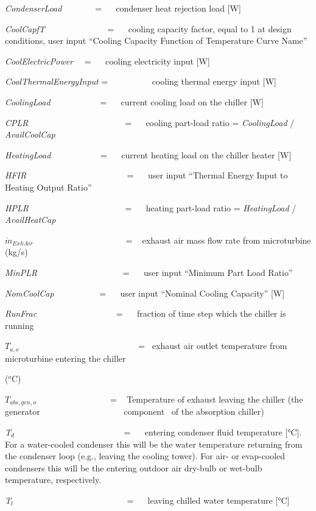 \emph{CondenserLoad~~~~~~~} = ~~ condenser heat rejection load {[}W{]}

\emph{CoolCapfT}~~~~~~~~~~~~~~ = ~~ cooling capacity factor, equal to 1 at design conditions, user input ``Cooling Capacity Function of Temperature Curve Name''

\emph{CoolElectricPower}~~ = ~~ cooling electricity input {[}W{]}

\emph{CoolThermalEnergyInput} = ~~~~~~~~~ cooling thermal energy input {[}W{]}

\emph{CoolingLoad}~~~~~~~~~~~ = ~~ current cooling load on the chiller {[}W{]}

\emph{CPLR}~~~~~~~~~~~~~~~~~~~~~~ = ~~ cooling part-load ratio = \emph{CoolingLoad} / \emph{AvailCoolCap}

\emph{HeatingLoad}~~~~~~~~~~~ = ~~ current heating load on the chiller heater {[}W{]}

\emph{HFIR}~~~~~~~~~~~~~~~~~~~~~~~ = ~~ user input ``Thermal Energy Input to Heating Output Ratio''

\emph{HPLR}~~~~~~~~~~~~~~~~~~~~~~ = ~~ heating part-load ratio = \emph{HeatingLoad} / \emph{AvailHeatCap}

\({\dot m_{ExhAir}}\) ~~~~~~ ~~~~~~~~~~~ ~~ = ~ exhaust air mass flow rate from microturbine (kg/s)

\emph{MinPLR~~~~~~~~~~~~~~~~~~~} = ~~ user input ``Minimum Part Load Ratio''

\emph{NomCoolCap}~~~~~~~~~~ = ~~ user input ``Nominal Cooling Capacity'' {[}W{]}

\emph{RunFrac}~~~~~~~~~~~~~~~~~~ = ~~ fraction of time step which the chiller is running

\({T_{a,o}}\) ~~~~~~~~~~~ ~~~~~~~~~~~~~~~ = ~exhaust air outlet temperature from microturbine entering the chiller

(\(^{o}\)C)

\({T_{abs,gen,o}}\) ~~~~~~~~~~~~~~~~ = ~ Temperature of exhaust leaving the chiller (the generator ~~~~~~~~~~~~~~~~~~~component~ of the absorption chiller)

\emph{T\(_{d}\)}~~~~~~~~~~~~~~~~~~~~~~~~~ = ~~ entering condenser fluid temperature {[}°C{]}. For a water-cooled condenser this will be the water temperature returning from the condenser loop (e.g., leaving the cooling tower). For air- or evap-cooled condensers this will be the entering outdoor air dry-bulb or wet-bulb temperature, respectively.

\emph{T\(_{l}\)}~~~~~~~~~~~~~~~~~~~~~~~~~~ = ~~ leaving chilled water temperature {[}°C{]}

